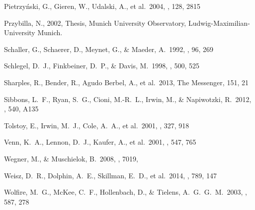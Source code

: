 \documentclass[iop]{emulateapj}
\begin{document}
\begin{thebibliography}{}
Pietrzy{\'n}ski, G., Gieren, W., Udalski, A., et al.\ 2004, \aj, 128, 2815 

 Przybilla, N., 2002, Thesis, Munich University
Observatory, Ludwig-Maximilian-University Munich.

 Schaller, G., Schaerer, D., Meynet, G., \& Maeder, A.\ 1992, \aaps, 96, 269 

 Schlegel, D.~J., 
Finkbeiner, D.~P., \& Davis, M.\ 1998, \apj, 500, 525 

 Sharples, R., Bender, 
R., Agudo Berbel, A., et al.\ 2013, The Messenger, 151, 21 

 Sibbons, L.~F., Ryan, S.~G., Cioni, M.-R.~L., Irwin, M., \& Napiwotzki, R.\ 2012, \aap, 540, A135 

 Tolstoy, E., Irwin, 
M.~J., Cole, A.~A., et al.\ 2001, \mnras, 327, 918 

 Venn, K.~A., Lennon, 
D.~J., Kaufer, A., et al.\ 2001, \apj, 547, 765 

 Wegner, M., \& Muschielok, B.\ 2008, \procspie, 7019,  

 Weisz, D.~R., Dolphin, 
A.~E., Skillman, E.~D., et al.\ 2014, \apj, 789, 147 

 Wolfire, M.~G., McKee, 
C.~F., Hollenbach, D., \& Tielens, A.~G.~G.~M.\ 2003, \apj, 587, 278 


\end{thebibliography}



\end{document}
